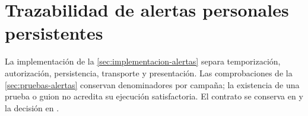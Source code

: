\section{Trazabilidad de alertas personales persistentes}\label{sec:matriz-alertas}

La implementación de la \cref{sec:implementacion-alertas} separa temporización, autorización, persistencia, transporte y presentación. Las comprobaciones de la \cref{sec:pruebas-alertas} conservan denominadores por campaña; la existencia de una prueba o guion no acredita su ejecución satisfactoria. El contrato se conserva en  y la decisión en .

\begingroup

\setlength{\tabcolsep}{4pt}
\renewcommand{\arraystretch}{1.13}

